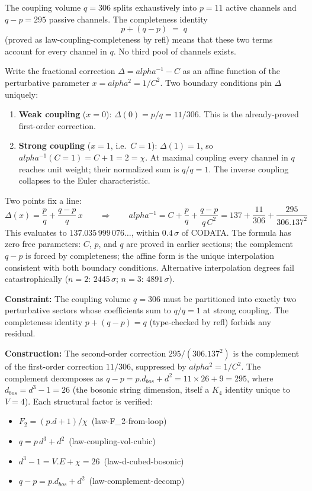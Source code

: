 \documentclass[11pt,a4paper]{book}
\def\alpha{alpha}%
\def\cdot{.}%
\def\mathrm#1{#1}%
\def\texttt#1{#1}%
\def\ensuremath#1{#1}%
\begin{document}
The coupling volume $q = 306$ splits exhaustively into $p = 11$ active channels
and $q - p = 295$ passive channels.  The completeness identity
\[
  p + (q - p) \;=\; q
\]
(proved as \texttt{law-coupling-completeness} by \texttt{refl}) means that these two
terms account for every channel in $q$.  No third pool of channels exists.

Write the fractional correction $\Delta = \alpha^{-1} - C$ as an affine function of the
perturbative parameter $x = \alpha^2 = 1/C^2$.  Two boundary conditions pin $\Delta$
uniquely:
%
\begin{enumerate}
\item \textbf{Weak coupling} ($x = 0$): $\Delta(0) = p/q = 11/306$.  This is the
  already-proved first-order correction.
\item \textbf{Strong coupling} ($x = 1$, i.e.\ $C = 1$):
  $\Delta(1) = 1$, so $\alpha^{-1}(C=1) = C + 1 = 2 = \chi$.
  At maximal coupling every channel in $q$ reaches unit weight; their normalized
  sum is $q/q = 1$.  The inverse coupling collapses to the Euler characteristic.
\end{enumerate}
%
Two points fix a line:
\[
  \Delta(x) = \frac{p}{q} + \frac{q-p}{q}\,x
  \qquad\Longrightarrow\qquad
  \alpha^{-1} = C + \frac{p}{q} + \frac{q-p}{q\,C^2}
  = 137 + \frac{11}{306} + \frac{295}{306 \cdot 137^2}
\]
This evaluates to $137.035\,999\,076\ldots$, within $0.4\,\sigma$ of
CODATA.  The formula has zero free parameters: $C$, $p$, and $q$ are proved in
earlier sections; the complement $q - p$ is forced by completeness; the
affine form is the unique interpolation consistent with both boundary
conditions.  Alternative interpolation degrees fail catastrophically
($n = 2$: $2445\,\sigma$; $n = 3$: $4891\,\sigma$).

\medskip
\noindent
\textbf{Constraint:}
The coupling volume $q = 306$ must be partitioned into exactly two
perturbative sectors whose coefficients sum to $q/q = 1$ at strong coupling.
The completeness identity $p + (q-p) = q$ (type-checked by \texttt{refl})
forbids any residual.

\medskip
\noindent
\textbf{Construction:}
The second-order correction $295/(306 \cdot 137^2)$ is the complement of the
first-order correction $11/306$, suppressed by $\alpha^2 = 1/C^2$.  The
complement decomposes as $q - p = p \cdot d_{\mathrm{bos}} + d^2 =
11 \times 26 + 9 = 295$, where $d_{\mathrm{bos}} = d^3 - 1 = 26$
(the bosonic string dimension, itself a $K_4$ identity unique to $V = 4$).
Each structural factor is verified:
\begin{itemize}
\item $F_2 = (p \cdot d + 1)/\chi$\, (\texttt{law-F\ensuremath{_2}-from-loop})
\item $q = p\,d^3 + d^2$\, (\texttt{law-coupling-vol-cubic})
\item $d^3 - 1 = V \cdot E + \chi = 26$\,
  (\texttt{law-d-cubed-bosonic})
\item $q - p = p \cdot d_{\mathrm{bos}} + d^2$\,
  (\texttt{law-complement-decomp})
\end{itemize}
\end{document}
